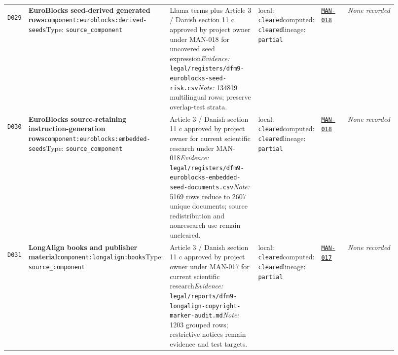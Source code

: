 \documentclass[9pt,a4paper]{article}
\newcommand{\depid}[1]{\hypertarget{dep:#1}{\texttt{#1}}}
\begin{document}
\begin{landscape}
\begin{longtable}{@{}L{0.035\linewidth}L{0.185\linewidth}L{0.27\linewidth}L{0.09\linewidth}L{0.10\linewidth}L{0.24\linewidth}@{}}
\depid{D029} & \textbf{EuroBlocks seed-derived generated rows}\newline \nolinkurl{component:euroblocks:derived-seeds}\newline Type: \texttt{source\_component} & Llama terms plus Article 3 / Danish section 11 c approved by project owner under MAN-018 for uncovered seed expression\newline \textit{Evidence:} \nolinkurl{legal/registers/dfm9-euroblocks-seed-risk.csv}\newline \textit{Note:} 134819 multilingual rows; preserve overlap-test strata. & local: \texttt{cleared}\newline computed: \texttt{cleared}\newline lineage: \texttt{partial} & \hyperlink{manual:MAN-018}{\texttt{MAN-018}} & \textit{None recorded} \\
\depid{D030} & \textbf{EuroBlocks source-retaining instruction-generation rows}\newline \nolinkurl{component:euroblocks:embedded-seeds}\newline Type: \texttt{source\_component} & Article 3 / Danish section 11 c approved by project owner for current scientific research under MAN-018\newline \textit{Evidence:} \nolinkurl{legal/registers/dfm9-euroblocks-embedded-seed-documents.csv}\newline \textit{Note:} 5169 rows reduce to 2607 unique documents; source redistribution and nonresearch use remain uncleared. & local: \texttt{cleared}\newline computed: \texttt{cleared}\newline lineage: \texttt{partial} & \hyperlink{manual:MAN-018}{\texttt{MAN-018}} & \textit{None recorded} \\
\depid{D031} & \textbf{LongAlign books and publisher material}\newline \nolinkurl{component:longalign:books}\newline Type: \texttt{source\_component} & Article 3 / Danish section 11 c approved by project owner under MAN-017 for current scientific research\newline \textit{Evidence:} \nolinkurl{legal/reports/dfm9-longalign-copyright-marker-audit.md}\newline \textit{Note:} 1203 grouped rows; restrictive notices remain evidence and test targets. & local: \texttt{cleared}\newline computed: \texttt{cleared}\newline lineage: \texttt{partial} & \hyperlink{manual:MAN-017}{\texttt{MAN-017}} & \textit{None recorded} \\

\end{longtable}
\end{landscape}
\end{document}
